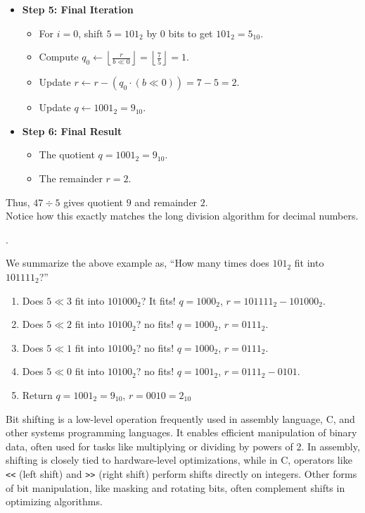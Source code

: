 \begin{itemize}
    \item \textbf{Step 5: Final Iteration}
    \begin{itemize}
        \item For $i = 0$, shift $5 = 101_2$ by $0$ bits to get $101_2 = 5_{10}$.
        \item Compute $q_0 \gets \left\lfloor \frac{r}{b \ll 0} \right\rfloor = \left\lfloor \frac{7}{5} \right\rfloor = 1$.
        \item Update $r \gets r - (q_0 \cdot (b \ll 0)) = 7 - 5 = 2$.
        \item Update $q \gets 1001_2 = 9_{10}$.
    \end{itemize}
    
    \item \textbf{Step 6: Final Result}
    \begin{itemize}
        \item The quotient $q = 1001_2 = 9_{10}$.
        \item The remainder $r = 2$.
    \end{itemize}
\end{itemize}

\noindent
Thus, $47 \div 5$ gives quotient $9$ and remainder $2$.\\
Notice how this exactly matches the long division algorithm for decimal numbers.\\
\begin{center}
    .
\end{center}
We summarize the above example as, ``How many times does $101_2$ fit into $101111_2$?''
\begin{enumerate}
    \item  Does $5\ll 3$ fit into $101000_2$? It fits! $q=1000_2$, $r = 101111_2 - 101000_2$.
    \item  Does $5\ll 2$ fit into $10100_2$? no fits! $q=1000_2$, $r = 0111_2$.
    \item  Does $5\ll 1$ fit into $10100_2$? no fits! $q=1000_2$, $r = 0111_2$.
    \item  Does $5\ll 0$ fit into $10100_2$? no fits! $q=1001_2$, $r = 0111_2-0101$.
    \item  Return $q=1001_2=9_{10}$, $r = 0010 = 2_{10}$ 
\end{enumerate}

\begin{Tip}
    Bit shifting is a low-level operation frequently used in assembly language, C, and other systems programming languages. It enables efficient manipulation of binary data, often used for tasks like multiplying or dividing by powers of 2. In assembly, shifting is closely tied to hardware-level optimizations, while in C, operators like \texttt{<<} (left shift) and \texttt{>>} (right shift) perform shifts directly on integers. Other forms of bit manipulation, like masking and rotating bits, often complement shifts in optimizing algorithms.
\end{Tip}



